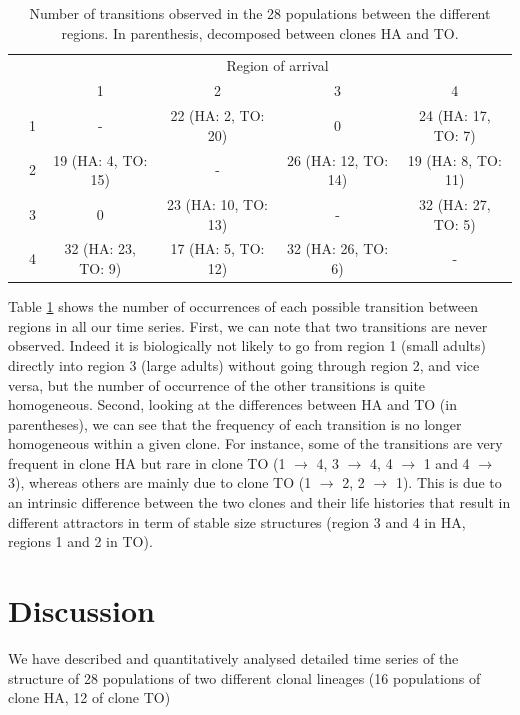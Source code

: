 \begin{table}
\small
\centering
\caption{\label{tab:AnSP2}Number of transitions observed in the 28 populations between the different regions. In parenthesis, decomposed between clones HA and TO.}
\renewcommand{\arraystretch}{1.5}%
\begin{tabular}{|rr|cccc|}
\hline 
	&  & & \multicolumn{2}{c}{Region of arrival}  & \\	
	&	& 1 & 2 & 3 & 4 \\
\hline
\parbox[t]{2mm}{} &
1 & - & 22 (HA: 2, TO: 20) & 0 & 24 (HA: 17, TO: 7) \\
 & 2 & 19 (HA: 4, TO: 15) & - & 26 (HA: 12, TO: 14) & 19 (HA: 8,
TO: 11)\\
 & 3 & 0 & 23 (HA: 10, TO: 13) & - & 32 (HA: 27, TO: 5) \\
 & 4 & 32 (HA: 23, TO: 9) & 17 (HA: 5, TO: 12) & 32 (HA: 26, TO: 6)
& -\\
	
\hline

\end{tabular} 
\end{table}

Table \ref{tab:AnSP2} shows the number of occurrences of each possible
transition between regions in all our time series. First, we can note that two transitions are
never observed. Indeed it is biologically not likely to go from region 1 (small
adults) directly into region 3 (large adults) without going through region 2,
and vice versa, but the number of occurrence of the other transitions is quite
homogeneous. Second, looking at the differences between HA and TO (in
parentheses), we can see that the frequency of each transition is no longer
homogeneous within a given clone. For instance, some of the transitions are very
frequent in clone HA but rare in clone TO (1 $\rightarrow$ 4, 3 $\rightarrow$ 4, 4 $\rightarrow$ 1 and 4 $\rightarrow$ 3), whereas
others are mainly due to clone TO (1 $\rightarrow$ 2, 2 $\rightarrow$ 1). This is due to an intrinsic
difference between the two clones and their life histories that result in
different attractors in term of stable size structures (region 3 and 4 in HA,
regions 1 and 2 in TO).

\section{Discussion}

We have described and quantitatively analysed detailed time series of the
structure of 28 populations of two different clonal lineages (16 populations of
clone HA, 12 of clone TO)

